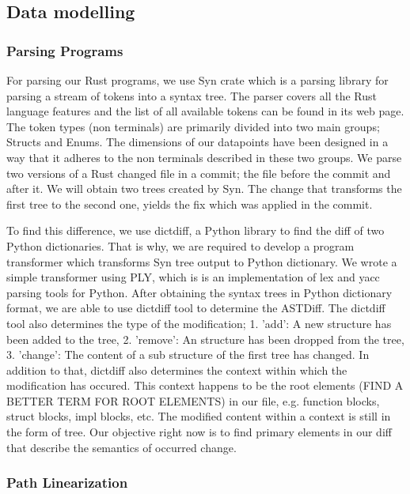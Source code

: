 \subsection{Data modelling}

\subsubsection{Parsing Programs}

For parsing our Rust programs, we use Syn crate which is a parsing library for parsing a stream of tokens into a syntax tree. The parser covers all the Rust language features and the list of all available tokens can be found in its web page. The token types (non terminals) are primarily divided into two main groups; Structs and Enums. The dimensions of our datapoints have been designed in a way that it adheres to the non terminals described in these two groups. We parse two versions of a Rust changed file in a commit; the file before the commit and after it. We will obtain two trees created by Syn. The change that transforms the first tree to the second one, yields the fix which was applied in the commit. 

To find this difference, we use dictdiff, a Python library to find the diff of two Python dictionaries. That is why, we are required to develop a program transformer which transforms Syn tree output to Python dictionary. We wrote a simple transformer using PLY, which is is an implementation of lex and yacc parsing tools for Python. After obtaining the syntax trees in Python dictionary format, we are able to use dictdiff tool to determine the ASTDiff. The dictdiff tool also determines the type of the modification; 1. 'add': A new structure has been added to the tree, 2. 'remove': An structure has been dropped from the tree, 3. 'change': The content of a sub structure of the first tree has changed. In addition to that, dictdiff also determines the context within which the modification has occured. This context happens to be the root elements (FIND A BETTER TERM FOR ROOT ELEMENTS) in our file, e.g. function blocks, struct blocks, impl blocks, etc. The modified content within a context is still in the form of tree. Our objective right now is to find primary elements in our diff that describe the semantics of occurred change.

\subsubsection{Path Linearization}

